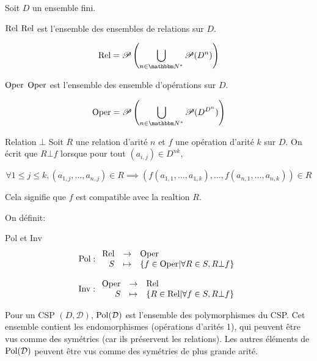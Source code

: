 Soit $D$ un ensemble fini.

\begin{defi}{$\text{Rel}$}
    $\text{Rel}$ est l'ensemble des ensembles de relations sur $D$.

    $$\Rel = \P\left(\bigcup_{n\in\mathbb{N^*}} \P(D^n)\right)$$
\end{defi}

\begin{defi}{$\text{Oper}$}
    $\text{Oper}$ est l'ensemble des ensemble d'opérations sur $D$.

    $$\Oper = \P\left(\bigcup_{n\in\mathbb{N^*}} \P(D^{D^n})\right)$$
\end{defi}

\begin{defi}{Relation $\bot$}
    Soit $R$ une relation d'arité $n$ et $f$ une opération d'arité $k$ sur $D$.
    On écrit que $R \bot f$ lorsque pour tout $(a_{i,j}) \in D^{nk}$,
    
    $$ \forall 1 \leq j \leq k, (a_{1,j},\dots,a_{n,j}) \in R \implies
    (f(a_{1,1},\dots,a_{1,k}),\dots,f(a_{n,1},\dots,a_{n,k})) \in R$$
    
    Cela signifie que $f$ est compatible avec la realtion $R$.
\end{defi}

On définit:

\begin{defi}{Pol et Inv}
    $$\text{Pol}:\begin{array}{rcl}\text{Rel} & \rightarrow & \text{Oper} \\
    S & \mapsto & \{f\in\text{Oper} | \forall R\in S, R\bot f\} \\
    \end{array}$$
    
    $$\text{Inv}:\begin{array}{rcl}\text{Oper} & \rightarrow & \text{Rel} \\
    S & \mapsto & \{R\in\text{Rel} | \forall f\in S, R\bot f\} \\
    \end{array}$$
\end{defi}

Pour un CSP $(D,\mathcal{D})$, $\text{Pol}(\mathcal{D})$ est l'ensemble des
polymorphismes du CSP. Cet ensemble contient les endomorphismes (opérations
d'arités 1), qui peuvent être vus comme des symétries (car ils préservent les
relations). Les autres éléments de $\text{Pol}(\mathcal{D})$ peuvent être vus comme
des symétries de plus grande arité.


